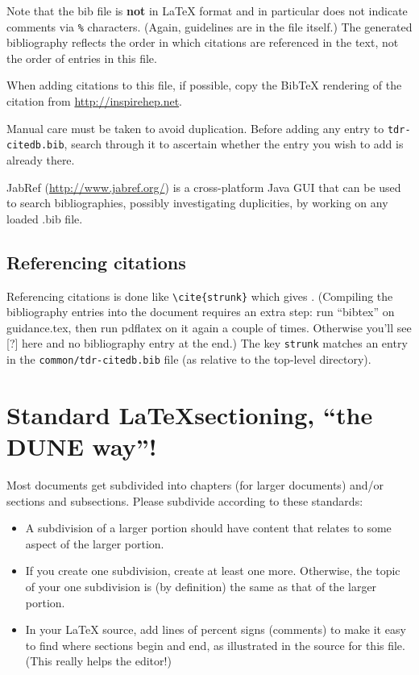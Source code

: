 Note that the bib file is \textbf{not} in \LaTeX{} format and in particular does not
indicate comments via \texttt{\%} characters. (Again, guidelines are in the file itself.)
The
generated bibliography reflects the order in which citations are referenced in the text, not the order of entries in this file.

When adding citations to this file, if possible, copy the BibTeX rendering of the citation from \url{http://inspirehep.net}.

Manual care must be taken to avoid duplication. %
Before adding any entry to \texttt{tdr-citedb.bib}, search through it
to ascertain whether the entry you wish to add is already there.

JabRef (\url{http://www.jabref.org/}) is a cross-platform Java GUI that can be used to search bibliographies, possibly investigating duplicities, by working on any loaded .bib file.

\subsection{Referencing citations}
\label{sec:latex-ref}

Referencing citations is done like \verb|\cite{strunk}| which gives \cite{strunk}.
(Compiling the bibliography entries into the document requires an extra step: run ``bibtex'' on
 guidance.tex, then run pdflatex on it again a couple of times. Otherwise you'll see [?] here 
 and no bibliography entry at the end.) 
The key \texttt{strunk} matches an entry in the \texttt{common/tdr-citedb.bib}
file (as relative to the top-level directory).

\section{Standard \LaTeX sectioning, ``the DUNE way''!}
\label{sec:latex-sectioning}

Most documents get subdivided into chapters (for larger documents) and/or sections and subsections. Please subdivide according to these standards:

\begin{itemize}
\item A subdivision of a larger portion should have content that relates to some aspect of the larger portion. 
\item  If you create one subdivision, create at least one more. Otherwise, the topic of your one subdivision is (by definition) the same as that of the larger portion.
\item In your \LaTeX{} source, add lines of percent signs (comments) to make it easy to find where sections begin and end, as illustrated in the source for this file. (This really helps the editor!)
\end{itemize}

